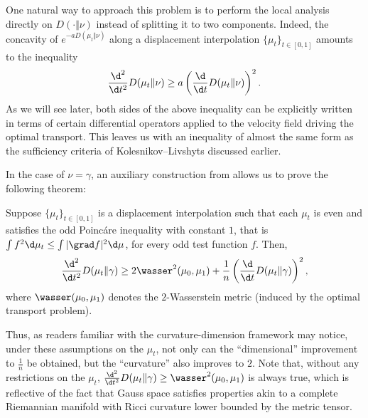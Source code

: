 One natural way to approach this problem is to perform the local analysis directly on $D(\cdot \Vert \nu)$ instead of splitting it to two components. Indeed, the concavity of $e^{-a D(\mu_{t} \Vert \nu)}$ along a displacement interpolation $\{ \mu_{t} \}_{t \in [0,1]}$ amounts to the inequality
\begin{equation}
    \frac{\d^{2}}{\d t^{2}} D(\mu_{t} \Vert \nu) \geq a \left( \frac{\d}{\d t} D(\mu_{t} \Vert \nu)  \right)^{2}.
\end{equation}
As we will see later, both sides of the above inequality can be explicitly written in terms of certain differential operators applied to the velocity field driving the optimal transport. This  leaves us with an inequality of almost the same form as the sufficiency criteria of Kolesnikov--Livshyts discussed earlier. 

In the case of $\nu = \gamma$, an auxiliary construction from \cite{EskenazisMoschidis21} allows us to prove the following theorem:
\begin{thm} \label{thm: gaussianentintro}
    Suppose $\{ \mu_{t} \}_{t \in [0,1]}$ is a displacement interpolation such that each $\mu_{t}$ is even and satisfies the odd Poinc\'are inequality with constant $1$, that is $\int f^{2} \d \mu_{t} \leq \int \vert \grad f \vert^{2} \d \mu$, for every odd test function $f$. Then,
    \begin{equation}
    \frac{\d^{2}}{\d t^{2}} D(\mu_{t} \Vert \gamma) \geq 2 \wasser^{2}(\mu_{0},\mu_{1}) + \frac{1}{n} \left( \frac{\d}{\d t} D(\mu_{t} \Vert \gamma)  \right)^{2},
    \end{equation}
    where $\wasser(\mu_{0},\mu_{1})$ denotes the $2$-Wasserstein metric (induced by the optimal transport problem).
\end{thm}
Thus, as readers familiar with the curvature-dimension framework may notice, under these assumptions on the $\mu_{t}$, not only can the ``dimensional'' improvement to $\frac{1}{n}$ be obtained, but the ``curvature'' also improves to $2$. Note that, without any restrictions on the $\mu_{t}$, $\frac{\d^{2}}{\d t^{2}} D(\mu_{t} \Vert \gamma) \geq  \wasser^{2}(\mu_{0},\mu_{1})$ is always true, which is reflective of the fact that Gauss space satisfies properties akin to a complete Riemannian manifold with Ricci curvature lower bounded by the metric tensor.


